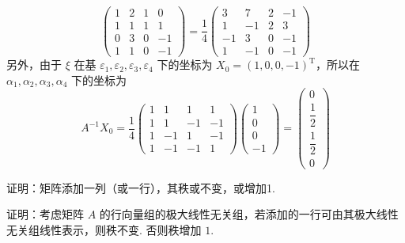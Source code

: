 \begin{exercise}
\begin{exgroup}
\begin{answer}
\[\begin{pmatrix}
                    1 & 2 & 1 & 0  \\
                    1 & 1 & 1 & 1  \\
                    0 & 3 & 0 & -1 \\
                    1 & 1 & 0 & -1
                \end{pmatrix} = \dfrac{1}{4} \begin{pmatrix}
                    3  & 7  & 2 & -1 \\
                    1  & -1 & 2 & 3  \\
                    -1 & 3  & 0 & -1 \\
                    1  & -1 & 0 & -1
                \end{pmatrix} \]
            另外，由于 $ \xi $ 在基 $ \varepsilon_1, \varepsilon_2, \varepsilon_3, \varepsilon_4 $ 下的坐标为 $ X_0 = (1, 0, 0, -1)^{\mathrm{T}} $，所以在 $ \alpha_1, \alpha_2, \alpha_3, \alpha_4 $ 下的坐标为
            \[ A^{-1} X_0 = \dfrac{1}{4} \begin{pmatrix}
                    1 & 1  & 1  & 1  \\
                    1 & 1  & -1 & -1 \\
                    1 & -1 & 1  & -1 \\
                    1 & -1 & -1 & 1
                \end{pmatrix} \begin{pmatrix}
                    1 \\ 0 \\ 0 \\ -1
                \end{pmatrix} = \begin{pmatrix}
                    0 \\ \dfrac{1}{2} \\ \dfrac{1}{2} \\ 0
                \end{pmatrix} \]
        \end{answer}

        \item 证明：矩阵添加一列（或一行），其秩或不变，或增加1.
        \begin{answer}
            证明：考虑矩阵 $A$ 的行向量组的极大线性无关组，若添加的一行可由其极大线性无关组线性表示，则秩不变. 否则秩增加 $1$.
        \end{answer}


\end{exgroup}
\end{exercise}
